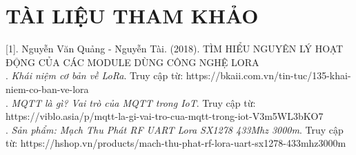 \section*{TÀI LIỆU THAM KHẢO}
[1]. Nguyễn Văn Quảng - Nguyễn Tài. (2018). TÌM HIỂU NGUYÊN LÝ HOẠT ĐỘNG CỦA CÁC MODULE DÙNG CÔNG NGHỆ LORA\\
\indent [2]. \textit{Khái niệm cơ bản về LoRa}. Truy cập từ: https://bkaii.com.vn/tin-tuc/135-khai-niem-co-ban-ve-lora\\
\indent [3]. \textit{MQTT là gì? Vai trò của MQTT trong IoT}. Truy cập từ: https://viblo.asia/p/mqtt-la-gi-vai-tro-cua-mqtt-trong-iot-V3m5WL3bKO7\\
\indent [4]. \textit{Sản phẩm: Mạch Thu Phát RF UART Lora SX1278 433Mhz 3000m}. Truy cập từ: https://hshop.vn/products/mach-thu-phat-rf-lora-uart-sx1278-433mhz3000m
